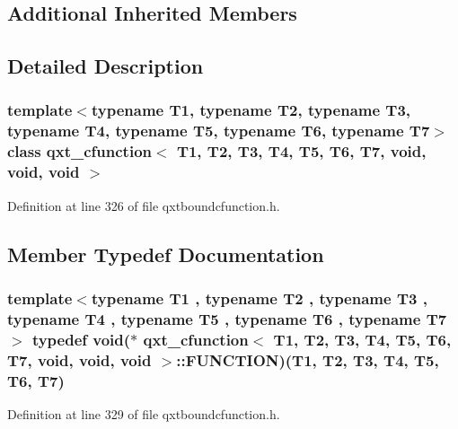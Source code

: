 \subsection*{Additional Inherited Members}


\subsection{Detailed Description}
\subsubsection*{template$<$typename T1, typename T2, typename T3, typename T4, typename T5, typename T6, typename T7$>$class qxt\-\_\-cfunction$<$ T1, T2, T3, T4, T5, T6, T7, void, void, void $>$}



Definition at line 326 of file qxtboundcfunction.\-h.



\subsection{Member Typedef Documentation}
\hypertarget{classqxt__cfunction_3_01_t1_00_01_t2_00_01_t3_00_01_t4_00_01_t5_00_01_t6_00_01_t7_00_01void_00_01void_00_01void_01_4_aca36e5e5a52651c231f8b4f555806aeb}{
\subsubsection[{F\-U\-N\-C\-T\-I\-O\-N}]{\setlength{\rightskip}{0pt plus 5cm}template$<$typename T1 , typename T2 , typename T3 , typename T4 , typename T5 , typename T6 , typename T7 $>$ typedef {\bf void}($\ast$ {\bf qxt\-\_\-cfunction}$<$ T1, T2, T3, T4, T5, T6, T7, {\bf void}, {\bf void}, {\bf void} $>$\-::F\-U\-N\-C\-T\-I\-O\-N)(T1, T2, T3, T4, T5, T6, T7)}}\label{classqxt__cfunction_3_01_t1_00_01_t2_00_01_t3_00_01_t4_00_01_t5_00_01_t6_00_01_t7_00_01void_00_01void_00_01void_01_4_aca36e5e5a52651c231f8b4f555806aeb}


Definition at line 329 of file qxtboundcfunction.\-h.



